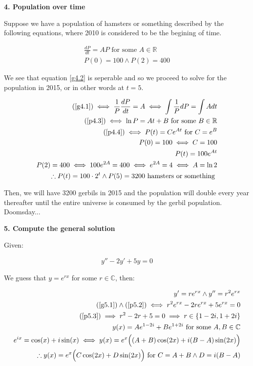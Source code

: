 \documentclass[12pt]{article}
\newcommand{\reals}{\mathbb{R}}
\newcommand{\cplx}{\mathbb{C}}
\begin{document}
\medskip

\textbf{4. Population over time}

Suppose we have a population of hamsters or something described by the following equations,
where 2010 is considered to be the begining of time.

\begin{align}
	\label{g4.1}
	\frac{dP}{dt} = AP \textrm{ for some } A \in \reals \\
	\label{g4.2}
	P(0) = 100 \land P(2) = 400
\end{align}

We see that equation \ref{g4.2} is seperable
and so we proceed to solve for the population in 2015,
or in other words at $t = 5$.

\begin{align}
	\label{p4.3}
	(\ref{g4.1}) \iff \frac{1}{P} \frac{dP}{dt} = A \iff \int \frac{1}{P} dP = \int A dt \\
	\label{p4.4}
	(\ref{p4.3}) \iff \ln P = At + B \textrm{ for some } B \in \reals \\
	(\ref{p4.4}) \iff P(t) = Ce^{At} \textrm{ for } C = e^B \\
	P(0) = 100 \iff C = 100 \\
	P(t) = 100e^{At} \\
	P(2) = 400 \iff 100e^{2A} = 400 \iff e^{2A} = 4 \iff A = \ln 2 \\
	\therefore P(t) = 100 \cdot 2^t \land P(5) = 3200 \textrm{ hamsters or something }
\end{align}

Then, we will have 3200 gerbils in 2015 and the population will double every year thereafter
until the entire universe is consumed by the gerbil population. Doomsday...

\medskip

\textbf{5. Compute the general solution}

Given:

\begin{align}
	\label{g5.1}
	y'' - 2y' + 5y = 0
\end{align}

We guess that $y = e^{rx}$ for some $r \in \cplx$, then:

\begin{align}
	\label{p5.2}
	y' = re^{rx} \land y'' = r^2e^{rx} \\
	\label{p5.3}
	(\ref{g5.1}) \land (\ref{p5.2}) \iff r^2e^{rx} - 2re^{rx} + 5e^{rx} = 0 \\
	\label{p5.4}
	(\ref{p5.3}) \implies r^2 - 2r + 5 = 0 \implies r \in \{ 1-2i, 1+2i \} \\
	y(x) = Ae^{1-2i} + Be^{1+2i} \textrm{ for some } A,B \in \cplx \\
	e^{ix} = \cos(x) + i \sin(x) \iff y(x) = e^x\Big((A+B)\cos(2x) + i(B-A)\sin(2x)\Big) \\
	\therefore y(x) = e^x\Big(C\cos(2x) + D\sin(2x)\Big) \textrm{ for } C = A + B \land D = i(B-A)
\end{align}
\end{document}
